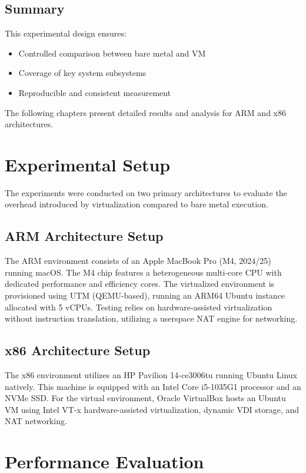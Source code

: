 \documentclass[conference]{IEEEtran}
\begin{document}
\subsection{Summary}

This experimental design ensures:

\begin{itemize}
    \item Controlled comparison between bare metal and VM
    \item Coverage of key system subsystems
    \item Reproducible and consistent measurement
\end{itemize}

The following chapters present detailed results and analysis for ARM and x86 architectures.

\section{Experimental Setup}

The experiments were conducted on two primary architectures to evaluate the overhead introduced by virtualization compared to bare metal execution.

\subsection{ARM Architecture Setup}
The ARM environment consists of an Apple MacBook Pro (M4, 2024/25) running macOS. The M4 chip features a heterogeneous multi-core CPU with dedicated performance and efficiency cores. The virtualized environment is provisioned using UTM (QEMU-based), running an ARM64 Ubuntu instance allocated with 5 vCPUs. Testing relies on hardware-assisted virtualization without instruction translation, utilizing a userspace NAT engine for networking.

\subsection{x86 Architecture Setup}
The x86 environment utilizes an HP Pavilion 14-ce3006tu running Ubuntu Linux natively. This machine is equipped with an Intel Core i5-1035G1 processor and an NVMe SSD. For the virtual environment, Oracle VirtualBox hosts an Ubuntu VM using Intel VT-x hardware-assisted virtualization, dynamic VDI storage, and NAT networking.

\section{Performance Evaluation}
\end{document}
